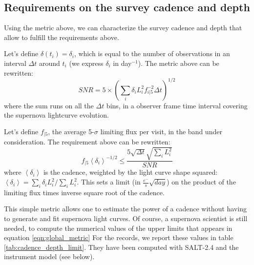 \documentclass[\docopts]{\docclass}
\begin{document}
\subsection{Requirements on the survey cadence and depth}

Using the metric above, we can characterize the survey cadence and
depth that allow to fulfill the requirements above.

Let's define $\delta(t_i) = \delta_i$, which is equal to the number of
observations in an interval $\Delta t$ around $t_i$ (we express
$\delta_i$ in day$^{-1}$). The metric above can be rewritten:
\begin{equation}
  SNR = 5 \times \left(\sum_i \delta_i L^2_i f^{-2}_{i|5} \Delta t\right)^{1/2}
\end{equation}
where the sum runs on all the $\Delta t$ bins, in a observer frame
time interval covering the supernova lightcurve evolution. 

Let's define $f_{|5}$, the average 5-$\sigma$ limiting flux per visit,
in the band under consideration. The requirement above can be
rewritten:
\begin{equation}
  f_{|5} \left<\delta_i\right>^{-1/2} \leq \frac{5 \sqrt{\Delta t} \sqrt{\sum_i L_i^2}}{SNR}
  \label{eqn:global_metric}
\end{equation}
where $\left<\delta_i\right>$ is the cadence, weighted by the light
curve shape squared: $\left<\delta_i\right> = \sum_i \delta_i
L_i^2/\sum_i L_i^2$.  This sets a limit (in $\frac{e^-}{s}
\sqrt{day}$) on the product of the limiting flux times inverse square
root of the cadence.

This simple metric allows one to estimate the power of a cadence
without having to generate and fit supernova light curves.  Of course,
a supernova scientist is still needed, to compute the numerical values
of the upper limits that appears in equation \ref{eqn:global_metric}
For the records, we report these values in table
\ref{tab:cadence_depth_limit}. They have been computed with SALT-2.4
and the  instrument model (see below).
\end{document}
